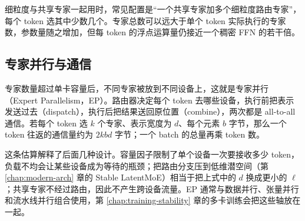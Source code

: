 细粒度与共享专家一起用时，常见配置是“一个共享专家加多个细粒度路由专家”，每个 token 选其中少数几个。专家总数可以远大于单个 token 实际执行的专家数，参数量随之增加，但每 token 的浮点运算量仍接近一个稠密 FFN 的若干倍。

\subsection{专家并行与通信}

专家数量超过单卡容量后，不同专家被放到不同设备上，这就是专家并行（Expert Parallelism，EP）。路由器决定每个 token 去哪些设备，执行前把表示发送过去（dispatch），执行后把结果送回原位置（combine），两次都是 all-to-all 通信。若每个 token 选 \(k\) 个专家、表示宽度为 \(d\)、每个元素 \(b\) 字节，那么一个 token 往返的通信量约为 \(2kbd\) 字节；一个 batch 的总量再乘 token 数。

这条估算解释了后面几种设计。容量因子限制了单个设备一次要接收多少 token，负载不均会让某些设备成为等待的瓶颈；把路由分支压到低维潜空间（第 \ref{chap:modern-arch} 章的 Stable LatentMoE）相当于把上式中的 \(d\) 换成更小的 \(\ell\)；共享专家不经过路由，因此不产生跨设备流量。EP 通常与数据并行、张量并行和流水线并行组合使用，第 \ref{chap:training-stability} 章的多卡训练会把这些轴放在一起。
